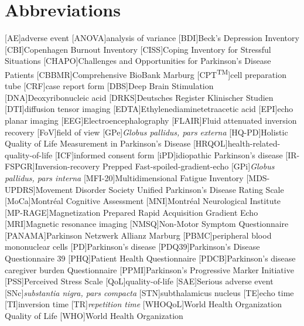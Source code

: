 \chapter*{Abbreviations}
\let\oldbaselinestretch=\baselinestretch%
\renewcommand{\baselinestretch}{1}%
\large\normalsize%
\thispagestyle{plain}
\begin{multicols}{2}
\begin{acronym}
\setlength{\parskip}{0ex}
[AE]{adverse event}
[ANOVA]{analysis of variance}
[BDI]{Beck's Depression Inventory}
[CBI]{Copenhagen Burnout Inventory}
[CISS]{Coping Inventory for Stressful Situations}
[CHAPO]{Challenges and Opportunities for Parkinson's Disease Patients}
[CBBMR]{Comprehensive BioBank Marburg}
[CPT\textsuperscript{TM}]{cell preparation tube}
[CRF]{case report form}
[DBS]{Deep Brain Stimulation}
[DNA]{Deoxyribonucleic acid}
[DRKS]{Deutsches Register Klinischer Studien}
[DTI]{diffusion tensor imaging}
[EDTA]{Ethylenediaminetetraacetic acid}
[EPI]{echo planar imaging}
[EEG]{Electroencephalography}
[FLAIR]{Fluid attenuated inversion recovery}
[FoV]{field of view}
[GPe]{\textit{Globus pallidus, pars externa}}
[HQ-PD]{Holistic Quality of Life Measurement in Parkinson's Disease}
[HRQOL]{health-related-quality-of-life}
[ICF]{informed consent form}
[iPD]{idiopathic Parkinson's disease}
[IR-FSPGR]{Inversion-recovery Prepped Fast-spoiled-gradient-echo}
[GPi]{\textit{Globus pallidus, pars interna}}
[MFI-20]{Multidimensional Fatigue Inventory}
[MDS-UPDRS]{Movement Disorder Society Unified Parkinson's Disease Rating Scale}
[MoCa]{Montréal Cognitive Assessment}
[MNI]{Montréal Neurological Institute}
[MP-RAGE]{Magnetization Prepared Rapid Acquisition Gradient Echo}
[MRI]{Magnetic resonance imaging}
[NMSQ]{Non-Motor Symptom Questionnaire}
[PANAMA]{Parkinson Netzwerk Allianz Marburg}
[PBMC]{peripheral blood mononuclear cells}
[PD]{Parkinson's disease}
[PDQ39]{Parkinson's Disease Questionnaire 39}
[PHQ]{Patient Health Questionnaire}
[PDCB]{Parkinson’s disease caregiver burden Questionnaire}
[PPMI]{Parkinson's Progressive Marker Initiative}
[PSS]{Perceived Stress Scale}
[QoL]{quality-of-life}
[SAE]{Serious adverse event}
[SNc]{\textit{substantia nigra, pars compacta}}
[STN]{subthalamicus nucleus}
[TE]{echo time}
[TI]{inversion time}
[TR]{\textit{repetition time}}
[WHOQoL]{World Health Organization Quality of Life}
[WHO]{World Health Organization}
\end{acronym}
\renewcommand{\baselinestretch}{\oldbaselinestretch}%
\large\normalsize%
\end{multicols}
